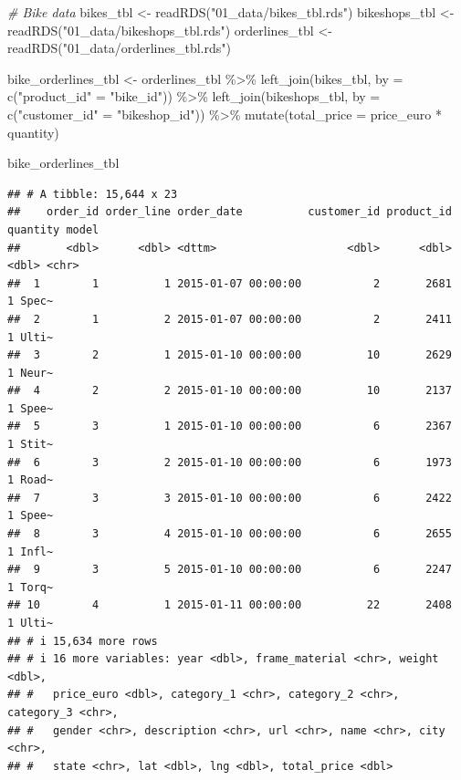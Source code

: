 \documentclass[
]{article}
\newenvironment{Shaded}{\begin{snugshade}}{\end{snugshade}}
\newcommand{\AttributeTok}[1]{\textcolor[rgb]{0.77,0.63,0.00}{#1}}
\newcommand{\CommentTok}[1]{\textcolor[rgb]{0.56,0.35,0.01}{\textit{#1}}}
\newcommand{\FunctionTok}[1]{\textcolor[rgb]{0.00,0.00,0.00}{#1}}
\newcommand{\NormalTok}[1]{#1}
\newcommand{\OtherTok}[1]{\textcolor[rgb]{0.56,0.35,0.01}{#1}}
\newcommand{\SpecialCharTok}[1]{\textcolor[rgb]{0.00,0.00,0.00}{#1}}
\newcommand{\StringTok}[1]{\textcolor[rgb]{0.31,0.60,0.02}{#1}}
\begin{document}
\begin{Shaded}
\begin{Highlighting}[]
\CommentTok{\# Bike data}
\NormalTok{bikes\_tbl      }\OtherTok{\textless{}{-}} \FunctionTok{readRDS}\NormalTok{(}\StringTok{"01\_data/bikes\_tbl.rds"}\NormalTok{)}
\NormalTok{bikeshops\_tbl  }\OtherTok{\textless{}{-}} \FunctionTok{readRDS}\NormalTok{(}\StringTok{"01\_data/bikeshops\_tbl.rds"}\NormalTok{)}
\NormalTok{orderlines\_tbl }\OtherTok{\textless{}{-}} \FunctionTok{readRDS}\NormalTok{(}\StringTok{"01\_data/orderlines\_tbl.rds"}\NormalTok{)}

\NormalTok{bike\_orderlines\_tbl }\OtherTok{\textless{}{-}}\NormalTok{ orderlines\_tbl }\SpecialCharTok{\%\textgreater{}\%}
    \FunctionTok{left\_join}\NormalTok{(bikes\_tbl,     }\AttributeTok{by =} \FunctionTok{c}\NormalTok{(}\StringTok{"product\_id"} \OtherTok{=} \StringTok{"bike\_id"}\NormalTok{)) }\SpecialCharTok{\%\textgreater{}\%}
    \FunctionTok{left\_join}\NormalTok{(bikeshops\_tbl, }\AttributeTok{by =} \FunctionTok{c}\NormalTok{(}\StringTok{"customer\_id"} \OtherTok{=} \StringTok{"bikeshop\_id"}\NormalTok{)) }\SpecialCharTok{\%\textgreater{}\%}
    \FunctionTok{mutate}\NormalTok{(}\AttributeTok{total\_price =}\NormalTok{ price\_euro }\SpecialCharTok{*}\NormalTok{ quantity)}

\NormalTok{bike\_orderlines\_tbl}
\end{Highlighting}
\end{Shaded}

\begin{verbatim}
## # A tibble: 15,644 x 23
##    order_id order_line order_date          customer_id product_id quantity model
##       <dbl>      <dbl> <dttm>                    <dbl>      <dbl>    <dbl> <chr>
##  1        1          1 2015-01-07 00:00:00           2       2681        1 Spec~
##  2        1          2 2015-01-07 00:00:00           2       2411        1 Ulti~
##  3        2          1 2015-01-10 00:00:00          10       2629        1 Neur~
##  4        2          2 2015-01-10 00:00:00          10       2137        1 Spee~
##  5        3          1 2015-01-10 00:00:00           6       2367        1 Stit~
##  6        3          2 2015-01-10 00:00:00           6       1973        1 Road~
##  7        3          3 2015-01-10 00:00:00           6       2422        1 Spee~
##  8        3          4 2015-01-10 00:00:00           6       2655        1 Infl~
##  9        3          5 2015-01-10 00:00:00           6       2247        1 Torq~
## 10        4          1 2015-01-11 00:00:00          22       2408        1 Ulti~
## # i 15,634 more rows
## # i 16 more variables: year <dbl>, frame_material <chr>, weight <dbl>,
## #   price_euro <dbl>, category_1 <chr>, category_2 <chr>, category_3 <chr>,
## #   gender <chr>, description <chr>, url <chr>, name <chr>, city <chr>,
## #   state <chr>, lat <dbl>, lng <dbl>, total_price <dbl>
\end{verbatim}
\end{document}

